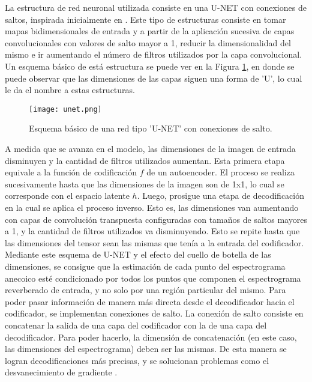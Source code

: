 La estructura de red neuronal utilizada consiste en una U-NET con conexiones de saltos, inspirada inicialmente en \cite{FCN}. Este tipo de estructuras consiste en tomar mapas bidimensionales de entrada y a partir de la aplicación sucesiva de capas convolucionales con valores de salto mayor a 1, reducir la dimensionalidad del mismo e ir aumentando el número de filtros utilizados por la capa convolucional. Un esquema básico de está estructura se puede ver en la Figura \ref{fig:unet}, en donde se puede observar que las dimensiones de las capas siguen una forma de 'U', lo cual le da el nombre a estas estructuras.

\begin{figure}[H]
	\centering{}
	\texttt{[image: unet.png]}
	\caption{Esquema básico de una red tipo 'U-NET' con conexiones de salto.}
	\label{fig:unet}
\end{figure}

A medida que se avanza en el modelo, las dimensiones de la imagen de entrada disminuyen y la cantidad de filtros utilizados aumentan. Esta primera etapa equivale a la función de codificación $f$ de un autoencoder. El proceso se realiza sucesivamente hasta que las dimensiones de la imagen son de 1x1, lo cual se corresponde con el espacio latente $h$. Luego, prosigue una etapa de decodificación en la cual se aplica el proceso inverso. Esto es, las dimensiones van aumentando con capas de convolución transpuesta configuradas con tamaños de saltos mayores a 1, y la cantidad de filtros utilizados va disminuyendo. Esto se repite hasta que las dimensiones del tensor sean las mismas que tenía a la entrada del codificador. Mediante este esquema de U-NET y el efecto del cuello de botella de las dimensiones, se consigue que la estimación de cada punto del espectrograma anecoico esté condicionado por todos los puntos que componen el espectrograma reverberado de entrada, y no solo por una región particular del mismo. Para poder pasar información de manera más directa desde el decodificador hacia el codificador, se implementan conexiones de salto. La conexión de salto consiste en concatenar la salida de una capa del codificador con la de una capa del decodificador. Para poder hacerlo, la dimensión de concatenación (en este caso, las dimensiones del espectrograma) deben ser las mismas. De esta manera se logran decodificaciones más precisas, y se solucionan problemas como el desvanecimiento de gradiente \cite{lagartija}. 

